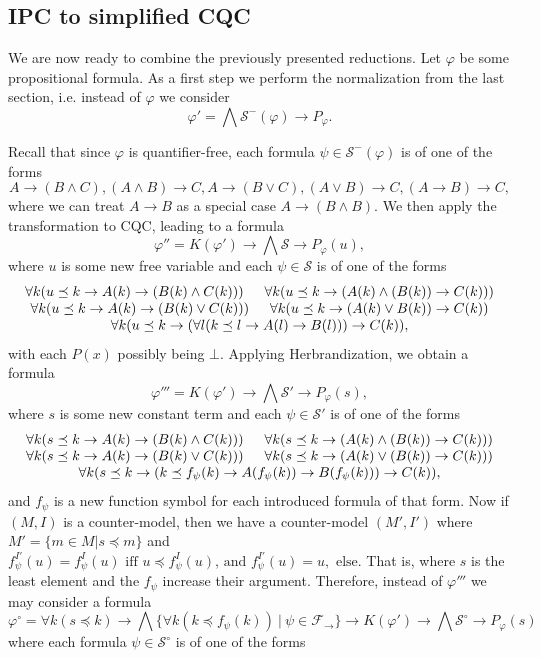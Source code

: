 \documentclass[a4paper,11pt]{report}
\theoremstyle{definition}
\theoremstyle{definition}
\theoremstyle{definition}
\theoremstyle{definition}
\theoremstyle{definition}
\theoremstyle{definition}
\theoremstyle{definition}
\begin{document}
	\subsection{IPC to simplified CQC}
	
	We are now ready to combine the previously presented reductions.
	Let $\varphi$ be some propositional formula. As a first step we perform the normalization from the last section, i.e. instead of $\varphi$ we consider $$\varphi' = \bigwedge \mathcal S^-(\varphi)\to P_\varphi.$$
	
	Recall that since $\varphi$ is quantifier-free, each formula $\psi\in\mathcal S^-(\varphi)$ is of one of the forms
	$$A\to (B\wedge C), (A\wedge B)\to C, A\to (B\vee C), (A\vee B)\to C, (A\to B)\to C,$$
	where we can treat $A\to B$ as a special case $A\to (B\wedge B)$. We then apply the transformation to CQC, leading to a formula
	$$\varphi'' = K(\varphi')\to\bigwedge  \mathcal S\to P_\varphi(u),$$
	where $u$ is some new free variable and each $\psi\in\mathcal S$ is of one of the forms
	$$\begin{matrix}
		\forall k(u\preceq k\to A(k)\to (B(k)\wedge C(k)))\indent  \forall k(u\preceq k\to (A(k)\wedge (B(k))\to C(k)))\\
		\forall k(u\preceq k\to A(k)\to (B(k)\vee C(k)))\indent \forall k(u\preceq k\to (A(k)\vee B(k))\to C(k))\\
		\forall k(u\preceq k\to (\forall l(k\preceq l \to A(l)\to B(l)))\to C(k)),
	\end{matrix}$$
	with each $P(x)$ possibly being $\bot$. Applying Herbrandization, we obtain a formula
	$$\varphi''' = K(\varphi')\to \bigwedge \mathcal S'\to P_\varphi(s),$$
	where $s$ is some new constant term and each $\psi\in\mathcal S'$ is of one of the forms
	$$\begin{matrix}
		\forall k(s\preceq k\to A(k)\to (B(k)\wedge C(k)))\indent \forall k(s\preceq k\to (A(k)\wedge (B(k))\to C(k)))\\
		\forall k(s\preceq k\to A(k)\to (B(k)\vee C(k)))\indent \forall k(s\preceq k\to (A(k)\vee (B(k))\to C(k)))\\
		\forall k(s\preceq k\to (k\preceq f_\psi(k) \to A(f_\psi(k))\to B(f_\psi(k)))\to C(k)),\\
	\end{matrix}$$
	and $f_\psi$ is a new function symbol for each introduced formula of that form. Now if $(M, I)$ is a counter-model, then we have a counter-model $(M',I')$ where $M' = \{m\in M|s\preceq m\}$ and
	$f_\psi^{I'}(u) = f^I_\psi(u) \text{ iff $u\preceq f^{I}_\psi(u)$, and $f_\psi^{I'}(u) = u,$ else.}$ That is, where $s$ is the least element and the $f_\psi$ increase their argument. Therefore, instead of $\varphi'''$ we may consider a formula $$\varphi^\circ = \forall k(s\preceq k)\to \bigwedge\{\forall k(k\preceq f_\psi(k))\:|\:\psi\in\mathcal F_\to\}\to K(\varphi')\to \bigwedge \mathcal S^\circ\to P_\varphi(s)$$ where each formula $\psi\in\mathcal S^\circ$ is of one of the forms
\end{document}
